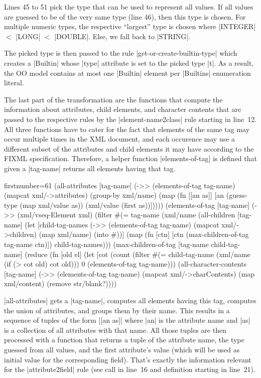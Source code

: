 \documentclass[submission]{eptcs}
\newcommand{\code}{\clojureinline}
\begin{document}
Lines 45 to 51 pick the type that can be used to represent all values.  If all
values are guessed to be of the very same type (line 46), then this type is
chosen.  For multiple numeric types, the respective ``largest'' type is chosen
where \code|INTEGER| \(<\)
\code|LONG| \(<\) \code|DOUBLE|.  Else, we fall back to \code|STRING|.

The picked type is then passed to the rule \code|get-or-create-builtin-type|
which creates a \code|Builtin| whose \code|type| attribute is set to the picked
type \code|t|.  As a result, the OO model contains at most one \code|Builtin|
element per \code|Builtins| enumeration literal.

The last part of the transformation are the functions that compute the
information about attributes, child elements, and character contents that are
passed to the respective rules by the \code|element-name2class| rule starting
in line~12.  All three functions have to cater for the fact that elements of
the same tag may occur multiple times in the XML document, and each occurence
may use a different subset of the attributes and child elements it may have
according to the FIXML specification.  Therefore, a helper function
\code|elements-of-tag| is defined that given a \code|tag-name| returns all
elements having that tag.

\begin{clojurecode*}{firstnumber=61}
  (all-attributes [tag-name]
   (->> (elements-of-tag tag-name) (mapcat xml/->attributes) (group-by xml/name)
        (map (fn [[an as]]
               [an (guess-type (map xml/value as)) (xml/value (first as))]))))
  (elements-of-tag [tag-name]
   (->> (xml/vseq-Element xml) (filter #(= tag-name (xml/name %
  (all-children [tag-name]
   (let [child-tag-names (->> (elements-of-tag tag-name) (mapcat xml/->children)
                              (map xml/name) (into #{}))]
     (map (fn [ctn] [ctn (max-children-of-tag tag-name ctn)]) child-tag-names)))
  (max-children-of-tag [tag-name child-tag-name]
   (reduce (fn [old el]
             (let [cot (count (filter #(= child-tag-name (xml/name %
               (if (> cot old) cot old)))
               0 (elements-of-tag tag-name)))
  (all-character-contents [tag-name]
   (->> (elements-of-tag tag-name) (mapcat xml/->charContents)
        (map xml/content) (remove str/blank?))))
\end{clojurecode*}

\code|all-attributes| gets a \code|tag-name|, computes all elements having this
tag, computes the union of attributes, and groups them by their name.  This
results in a sequence of tuples of the form \code|[an as]| where \code|an| is
the attribute name and \code|as| is a collection of all attributes with that
name.  All those tuples are then processed with a function that returns a tuple
of the attribute name, the type guessed from all values, and the first
attribute's value (which will be used as initial value for the corresponding
field).  That's exactly the information relevant for the \code|attribute2field|
rule (see call in line~16 and definition starting in line~21).
\end{document}
